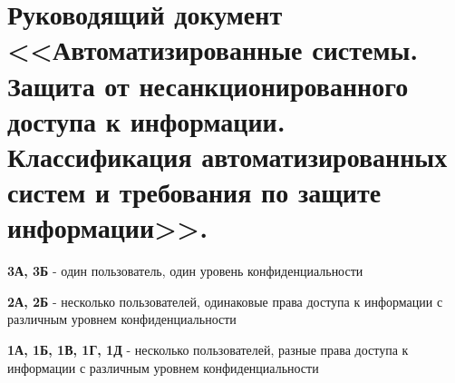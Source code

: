 \section{Руководящий документ <<Автоматизированные системы. Защита от несанкционированного доступа к информации. Классификация автоматизированных систем и требования по защите информации>>.}

\textbf{3А, 3Б} - один пользователь, один уровень конфиденциальности

\textbf{2А, 2Б} - несколько пользователей, одинаковые права доступа к информации с различным уровнем конфиденциальности

\textbf{1А, 1Б, 1В, 1Г, 1Д} - несколько пользователей, разные права доступа к информации с различным уровнем конфиденциальности